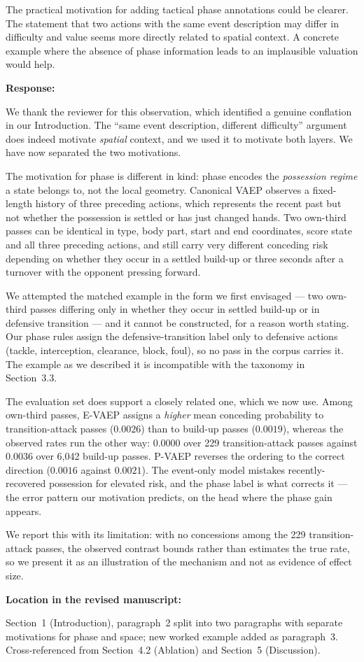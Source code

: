 \documentclass[11pt,a4paper]{article}
\newcommand{\response}[2]{%
  \begin{responsebox}
  \textbf{Response:}

  #1
  \end{responsebox}
  \begin{locationbox}
  \textbf{Location in the revised manuscript:}

  #2
  \end{locationbox}
}
\begin{document}
\begin{reviewbox}[Comment 1]
The practical motivation for adding tactical phase annotations could be clearer. The statement that two actions with the same event description may differ in difficulty and value seems more directly related to spatial context. A concrete example where the absence of phase information leads to an implausible valuation would help.
\end{reviewbox}
\response{We thank the reviewer for this observation, which identified a genuine conflation in our Introduction. The ``same event description, different difficulty'' argument does indeed motivate \emph{spatial} context, and we used it to motivate both layers. We have now separated the two motivations.

The motivation for phase is different in kind: phase encodes the \emph{possession regime} a state belongs to, not the local geometry. Canonical VAEP observes a fixed-length history of three preceding actions, which represents the recent past but not whether the possession is settled or has just changed hands. Two own-third passes can be identical in type, body part, start and end coordinates, score state and all three preceding actions, and still carry very different conceding risk depending on whether they occur in a settled build-up or three seconds after a turnover with the opponent pressing forward.

We attempted the matched example in the form we first envisaged --- two own-third passes differing only in whether they occur in settled build-up or in defensive transition --- and it cannot be constructed, for a reason worth stating. Our phase rules assign the defensive-transition label only to defensive actions (tackle, interception, clearance, block, foul), so no pass in the corpus carries it. The example as we described it is incompatible with the taxonomy in Section~3.3.

The evaluation set does support a closely related one, which we now use. Among own-third passes, E-VAEP assigns a \emph{higher} mean conceding probability to transition-attack passes ($0.0026$) than to build-up passes ($0.0019$), whereas the observed rates run the other way: $0.0000$ over 229 transition-attack passes against $0.0036$ over 6{,}042 build-up passes. P-VAEP reverses the ordering to the correct direction ($0.0016$ against $0.0021$). The event-only model mistakes recently-recovered possession for elevated risk, and the phase label is what corrects it --- the error pattern our motivation predicts, on the head where the phase gain appears.

We report this with its limitation: with no concessions among the 229 transition-attack passes, the observed contrast bounds rather than estimates the true rate, so we present it as an illustration of the mechanism and not as evidence of effect size.}{Section~1 (Introduction), paragraph~2 split into two paragraphs with separate motivations for phase and space; new worked example added as paragraph~3. Cross-referenced from Section~4.2 (Ablation) and Section~5 (Discussion).}
\end{document}
